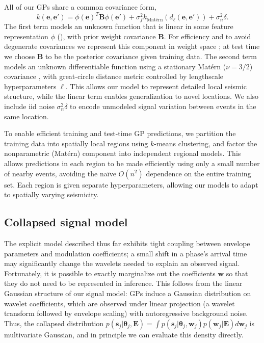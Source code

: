 \documentclass[twoside]{article} \usepackage{aistats2017}
\renewcommand{\v}[1]{\mathbf{#1}}
\begin{document}
All of our GPs share a common covariance form,
\[k(\v{e}, \v{e}') = \phi(\v{e})^T \v{B}\phi(\v{e}') + \sigma^2_f
k_\text{Mat\'ern}(d_\ell(\v{e}, \v{e}')) + \sigma^2_n \delta.\]
The first term models an unknown function that is linear in some
feature representation $\phi$ (), with prior
weight covariance $\v{B}$. For efficiency and to avoid degenerate
covariances we represent this component in weight space \citep[section 2.7]{rasmussen2006}; at test time we choose $\v{B}$
to be the posterior covariance given training
data. The second term models an unknown
differentiable function using a stationary Mat\'ern ($\nu=3/2$) covariance \citep[Chapter
4]{rasmussen2006}, with great-circle distance metric controlled by
lengthscale hyperparameters $\ell$. This allows our model to represent
detailed local seismic structure, while the linear term enables
generalization to novel locations. We also include iid noise
$\sigma^2_n \delta$ to encode unmodeled signal variation
between events in the same location.

To enable efficient training and test-time GP predictions,
we partition the training data into spatially local regions using
$k$-means clustering, and factor the nonparametric (Mat\'ern)
component into independent regional models. This allows predictions in
each region to be made efficiently using only a small number of nearby events, avoiding the na\"ive
$O(n^2)$ dependence on the entire training set. Each region is given
separate hyperparameters, allowing our models to adapt to spatially varying seismicity.

\subsection{Collapsed signal model}

The explicit model described thus far exhibits tight coupling between
envelope parameters and modulation coefficients; a small shift in a
phase's arrival time may significantly change the wavelets needed to
explain an observed signal. Fortunately, it is possible to exactly
marginalize out the coefficients $\v{w}$ so that they do not need to
be represented in inference. This follows from the linear Gaussian
structure of our signal model: GPs induce a Gaussian distribution on
wavelet coefficients, which are observed under linear projection (a
wavelet transform followed by envelope scaling) with autoregressive
background noise. Thus, the collapsed distribution
$p(\v{s}_j | \v{\theta}_j, \v{E}) = \int p(\v{s}_j | \v{\theta}_j, \v{w}_j)
p(\v{w}_j | \v{E}) d\v{w}_j$
is multivariate Gaussian, and in principle we can evaluate this density
directly.
\end{document}
